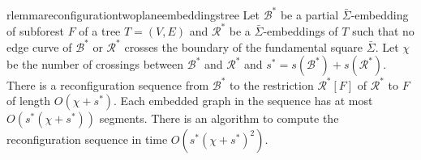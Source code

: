\documentclass[a4paper,USenglish,cleveref,colorlinks=true,urlcolor=black,linkcolor=black,citecolor=black,thm-restate,authorcolumns]{lipics-v2021}
\newcommand{\prooflink}[1]{\hypersetup{linkcolor=lipicsBulletGray}\hyperref[#1]{$\blacktriangledown$}}
\newcommand{\statlink}[1]{\hypersetup{linkcolor=lipicsYellow}\hyperref[#1]{$\blacktriangle$}}
\newcommand{\mylink}{}
\theoremstyle{claimstyle}
\begin{document}
\begin{restatable}{rlemma}{reconfigurationtwoplaneembeddingstree}
    \label{lem:reconfiguration-of-two-plane-embeddings-tree}
    \renewcommand{\mylink}{\statlink{lem:reconfiguration-of-two-plane-embeddings}\prooflink{Preconfigurationtwoplaneembeddingstree}}
    Let $\mathcal{B}^*$ be a partial $\bar\Sigma$-embedding of subforest $F$ of a tree $T=(V,E)$ and $\mathcal{R}^*$ be a $\bar{\Sigma}$-embeddings of $T$ such that no edge curve of $\mathcal{B}^*$ or $\mathcal{R}^*$ crosses the boundary of the fundamental square $\bar{\Sigma}$.
    Let $\chi$ be the number of crossings between $\mathcal{B}^*$
    and $\mathcal{R}^*$  and $s^* = s(\mathcal{B}^*) + s(\mathcal{R}^*) $.
    There is a reconfiguration sequence from $\mathcal{B}^*$ to the restriction $\mathcal{R}^*[F]$ of $\mathcal{R}^*$ to $F$ of length $O(\chi + s^*)$.
    Each embedded graph in the sequence has at most $O(s^*(\chi + s^*))$ segments.
    There is an algorithm to compute the reconfiguration sequence in time $O(s^*(\chi + s^*)^2)$.
\end{restatable}
\end{document}

